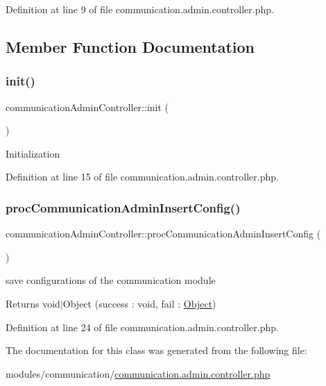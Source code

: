 Definition at line 9 of file communication.\+admin.\+controller.\+php.



\subsection{Member Function Documentation}
\hypertarget{classcommunicationAdminController_a6ad0b759ad3a139a7cf0784f62297bfb}{}\label{classcommunicationAdminController_a6ad0b759ad3a139a7cf0784f62297bfb} 
\subsubsection{\texorpdfstring{init()}{init()}}
{\footnotesize\ttfamily communication\+Admin\+Controller\+::init (\begin{DoxyParamCaption}{ }\end{DoxyParamCaption})}

Initialization 

Definition at line 15 of file communication.\+admin.\+controller.\+php.

\hypertarget{classcommunicationAdminController_a23dbacf4acc643cea069d1de93b406c9}{}\label{classcommunicationAdminController_a23dbacf4acc643cea069d1de93b406c9} 
\subsubsection{\texorpdfstring{proc\+Communication\+Admin\+Insert\+Config()}{procCommunicationAdminInsertConfig()}}
{\footnotesize\ttfamily communication\+Admin\+Controller\+::proc\+Communication\+Admin\+Insert\+Config (\begin{DoxyParamCaption}{ }\end{DoxyParamCaption})}

save configurations of the communication module \begin{DoxyReturn}{Returns}
void$\vert$\+Object (success \+: void, fail \+: \hyperlink{classObject}{Object}) 
\end{DoxyReturn}


Definition at line 24 of file communication.\+admin.\+controller.\+php.



The documentation for this class was generated from the following file\+:\begin{DoxyCompactItemize}
\item 
modules/communication/\hyperlink{communication_8admin_8controller_8php}{communication.\+admin.\+controller.\+php}\end{DoxyCompactItemize}
